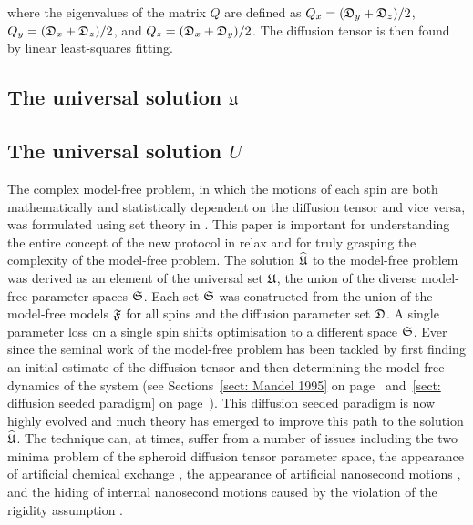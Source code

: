 \noindent where the eigenvalues of the matrix $Q$ are defined as $Q_x = (\mathfrak{D}_y + \mathfrak{D}_z)/2$, $Q_y = (\mathfrak{D}_x + \mathfrak{D}_z)/2$, and $Q_z = (\mathfrak{D}_x + \mathfrak{D}_y)/2$.
The diffusion tensor is then found by linear least-squares fitting.




\begin{latexonly}
    \subsection{The universal solution $\mathfrak{U}$}
\end{latexonly}
\begin{htmlonly}
    \subsection{The universal solution $U$}
\end{htmlonly}
\label{sect: universal solution}

The complex model-free problem, in which the motions of each spin are both mathematically and statistically dependent on the diffusion tensor and vice versa, was formulated using set theory in \citet{dAuvergneGooley07}.
This paper is important for understanding the entire concept of the new protocol in relax and for truly grasping the complexity of the model-free problem.
The solution $\widehat{\mathfrak{U}}$ to the model-free problem was derived as an element of the universal set $\mathfrak{U}$, the union of the diverse model-free parameter spaces $\mathfrak{S}$.
Each set $\mathfrak{S}$ was constructed from the union of the model-free models $\mathfrak{F}$ for all spins and the diffusion parameter set $\mathfrak{D}$.
A single parameter loss on a single spin shifts optimisation to a different space $\mathfrak{S}$.
Ever since the seminal work of \citet{Kay89} the model-free problem has been tackled by first finding an initial estimate of the diffusion tensor and then determining the model-free dynamics of the system (see Sections~\ref{sect: Mandel 1995} on page~\pageref{sect: Mandel 1995} and~\ref{sect: diffusion seeded paradigm} on page~\pageref{sect: diffusion seeded paradigm}).
This diffusion seeded paradigm is now highly evolved and much theory has emerged to improve this path to the solution $\widehat{\mathfrak{U}}$.
The technique can, at times, suffer from a number of issues including the two minima problem of the spheroid diffusion tensor parameter space, the appearance of artificial chemical exchange \citep{Tjandra96}, the appearance of artificial nanosecond motions \citep{Schurr94}, and the hiding of internal nanosecond motions caused by the violation of the rigidity assumption \citep{Orekhov95b, Orekhov99b, Orekhov99a}.




